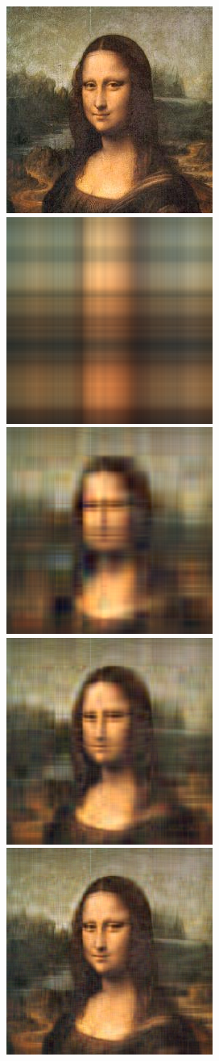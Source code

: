 \documentclass[]{IEEEtran}
\begin{document}
\begin{figure}[h]
  \centering
  \includegraphics[width=0.4\hsize]{../input/monalisa.png}
  \includegraphics[width=0.4\hsize]{../output/monalisa_1.png}
  \includegraphics[width=0.4\hsize]{../output/monalisa_5.png}
  \includegraphics[width=0.4\hsize]{../output/monalisa_10.png}
  \includegraphics[width=0.4\hsize]{../output/monalisa_20.png}

\end{figure}
\end{document}
